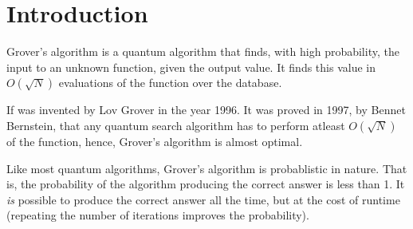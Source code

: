 \documentclass[a4paper]{article}
\begin{document}
\section*{Introduction}

Grover's algorithm is a quantum algorithm that finds, with high probability, 
the input to an unknown function, given the output value. It finds this value 
in $ O(\sqrt{N}) $ evaluations of the function over the database.

If was invented by Lov Grover in the year 1996. It was proved in 1997, 
by Bennet Bernstein, that any quantum search algorithm has to perform atleast 
$ O(\sqrt{N}) $ of the function, hence, Grover's algorithm is almost optimal.

Like most quantum algorithms, Grover's algorithm is probablistic in nature. 
That is, the probability of the algorithm producing the correct answer is less than 1.
It \textit{is} possible to produce the correct answer all the time, but at the cost 
of runtime (repeating the number of iterations improves the probability).
\end{document}
